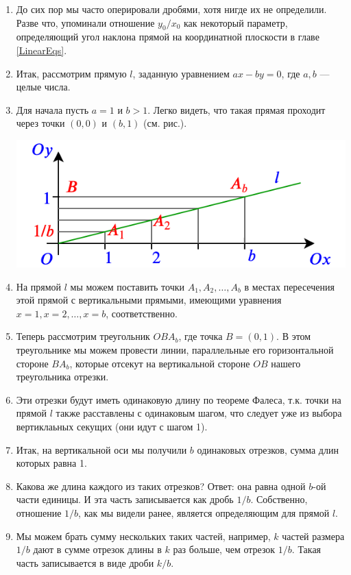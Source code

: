 \begin{enumerate}
\item До сих пор мы часто оперировали дробями, хотя нигде их не определили. Разве что, упоминали отношение $y_0/x_0$ как некоторый параметр, определяющий угол наклона прямой на координатной плоскости в главе \ref{LinearEqs}.
\item Итак, рассмотрим прямую $l$, заданную уравнением $ax-by=0$, где $a,b$ --- целые числа.
\item Для начала пусть $a=1$ и $b>1$. Легко видеть, что такая прямая проходит через точки $(0,0)$ и $(b,1)$ (см. рис.).
\begin{center}
\includegraphics[scale=0.5]{section.png}
\end{center}
\item На прямой $l$ мы можем поставить точки $A_1, A_2, \dots, A_b$ в местах пересечения этой прямой с вертикальными прямыми, имеющими уравнения $x=1, x=2, \dots, x=b$, соответственно.
\item Теперь рассмотрим треугольник $OBA_b$, где точка $B=(0,1)$. В этом треугольнике мы можем провести линии, параллельные его горизонтальной стороне $BA_b$, которые отсекут на вертикальной стороне $OB$ нашего треугольника отрезки.
\item Эти отрезки будут иметь одинаковую длину по теореме Фалеса, т.к. точки на прямой $l$ также расставлены с одинаковым шагом, что следует уже из выбора вертиклаьных секущих (они идут с шагом 1).
\item Итак, на вертикальной оси мы получили $b$ одинаковых отрезков, сумма длин которых равна 1.
\item Какова же длина каждого из таких отрезков? Ответ: она равна одной $b$-ой части единицы. И эта часть записывается как дробь $1/b$. Собственно, отношение $1/b$, как мы видели ранее, является определяющим для прямой $l$.
\item Мы можем брать сумму нескольких таких частей, например, $k$ частей размера $1/b$ дают в сумме отрезок длины в $k$ раз больше, чем отрезок $1/b$. Такая часть записывается в виде дроби $k/b$.

\end{enumerate}
